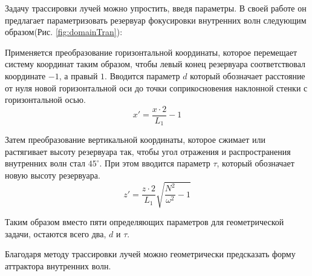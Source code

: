 Задачу трассировки лучей можно упростить, введя параметры. В своей работе он предлагает параметризовать резервуар фокусировки внутренних волн следующим образом(Рис. \ref{fig:domainTran}):

Применяется преобразование горизонтальной координаты, которое перемещает систему координат таким образом, чтобы левый конец резервуара соответствовал координате $-1$, а правый $1$. Вводится параметр $d$ который обозначает расстояние от нуля новой горизонтальной оси до точки соприкосновения наклонной стенки с горизонтальной осью.
\begin{equation}
    x'=\frac{x\cdot 2}{L_1}-1
    \label{eq:transformX}
\end{equation}

Затем преобразование вертикальной координаты, которое сжимает или растягивает высоту резервуара так, чтобы угол отражения и распространения внутренних волн стал $45^\circ$. При этом вводится параметр $\tau$, который обозначает новую высоту резервуара. 
\begin{equation}
    z'=\frac{z\cdot 2}{L_1}\sqrt{\frac{N^2}{\omega^2}-1}
    \label{eq:transformZ}
\end{equation}

Таким образом вместо пяти определяющих параметров для геометрической задачи, остаются всего два, $d$ и $\tau$.

Благодаря методу трассировки лучей можно геометрически предсказать форму аттрактора внутренних волн. 

